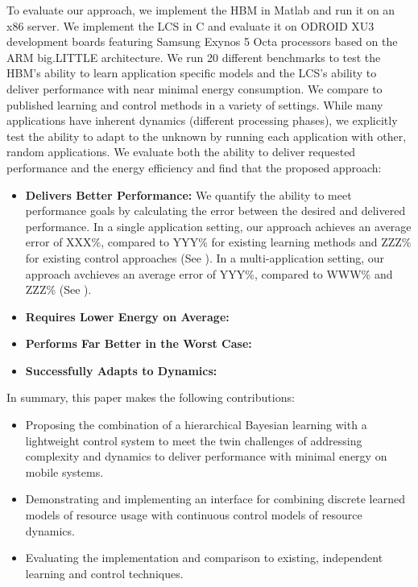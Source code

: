 To evaluate our approach, we implement the HBM in Matlab and run it on
an x86 server.  We implement the LCS in C and evaluate it on ODROID
XU3 development boards featuring Samsung Exynos 5 Octa processors
based on the ARM big.LITTLE architecture.  We run 20 different
benchmarks to test the HBM's ability to learn application specific
models and the LCS's ability to deliver performance with near minimal
energy consumption.  We compare to published learning and control
methods in a variety of settings.  While many applications have
inherent dynamics (\ie different processing phases), we explicitly
test the ability to adapt to the unknown by running each application
with other, random applications.  We evaluate both the ability to
deliver requested performance and the energy efficiency and find that
the proposed approach:
\begin{itemize}
\item \textbf{Delivers Better Performance: } We quantify the ability
  to meet performance goals by calculating the error between the
  desired and delivered performance.  In a single application setting,
  our approach achieves an average error of XXX\%, compared to YYY\%
  for existing learning methods and ZZZ\% for existing control
  approaches (See \secref{}).  In a multi-application setting, our
  approach avchieves an average error of YYY\%, compared to WWW\% and
  ZZZ\% (See \secref{}).
\item \textbf{Requires Lower Energy on Average:}
\item \textbf{Performs Far Better in the Worst Case:}
\item \textbf{Successfully Adapts to Dynamics:} 
\end{itemize}
In summary, this paper makes the following contributions:
\begin{itemize}
\item Proposing the combination of a hierarchical Bayesian learning with
  a lightweight control system to meet the twin challenges of
  addressing complexity and dynamics to deliver performance with
  minimal energy on mobile systems.
\item Demonstrating and implementing an interface for combining
  discrete learned models of resource usage with continuous control
  models of resource dynamics.
\item Evaluating the implementation and comparison to existing,
  independent learning and control techniques.
\end{itemize}


